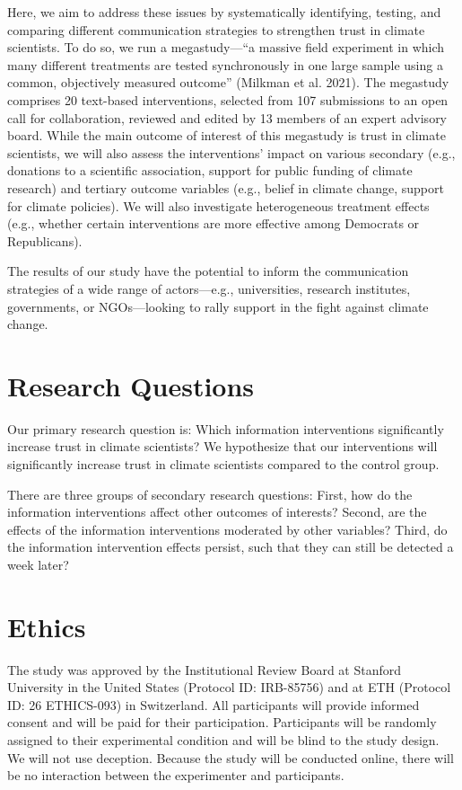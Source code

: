 \documentclass[
  letterpaper,
  DIV=11,
  numbers=noendperiod]{scrartcl}
\begin{document}
Here, we aim to address these issues by systematically identifying,
testing, and comparing different communication strategies to strengthen
trust in climate scientists. To do so, we run a megastudy---``a massive
field experiment in which many different treatments are tested
synchronously in one large sample using a common, objectively measured
outcome'' (Milkman et al. 2021). The megastudy comprises 20 text-based
interventions, selected from 107 submissions to an open call for
collaboration, reviewed and edited by 13 members of an expert advisory
board. While the main outcome of interest of this megastudy is trust in
climate scientists, we will also assess the interventions' impact on
various secondary (e.g., donations to a scientific association, support
for public funding of climate research) and tertiary outcome variables
(e.g., belief in climate change, support for climate policies). We will
also investigate heterogeneous treatment effects (e.g., whether certain
interventions are more effective among Democrats or Republicans).

The results of our study have the potential to inform the communication
strategies of a wide range of actors---e.g., universities, research
institutes, governments, or NGOs---looking to rally support in the fight
against climate change.

\section{Research Questions}\label{research-questions}

Our primary research question is: Which information interventions
significantly increase trust in climate scientists? We hypothesize that
our interventions will significantly increase trust in climate
scientists compared to the control group.

There are three groups of secondary research questions: First, how do
the information interventions affect other outcomes of interests?
Second, are the effects of the information interventions moderated by
other variables? Third, do the information intervention effects persist,
such that they can still be detected a week later?

\section{Ethics}\label{ethics}

The study was approved by the Institutional Review Board at Stanford
University in the United States (Protocol ID: IRB-85756) and at ETH
(Protocol ID: 26 ETHICS-093) in Switzerland. All participants will
provide informed consent and will be paid for their participation.
Participants will be randomly assigned to their experimental condition
and will be blind to the study design. We will not use deception.
Because the study will be conducted online, there will be no interaction
between the experimenter and participants.
\end{document}
